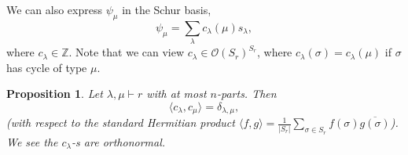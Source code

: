 \documentclass[10pt]{article}
\newtheorem{proposition}{Proposition}[section]
\numberwithin{equation}{theorem}
\newcommand{\Ouv}[0]{\mathcal{O}}
\newcommand{\Z}[0]{\mathbb{Z}}
\begin{document}
We can also express $\psi_\mu$ in the Schur basis, 
\begin{equation}
  \psi_\mu = \sum_{\lambda} c_\lambda(\mu) s_\lambda,
\end{equation}
where $c_\lambda\in\Z$. Note that we can view $c_\lambda\in\Ouv(S_r)^{S_r}$, where $c_\lambda(\sigma)=c_\lambda(\mu)$ if $\sigma$ has cycle of type $\mu$. 
\begin{proposition}
  Let $\lambda,\mu\vdash r$ with at most $n$-parts. Then 
  \begin{equation*}
  \langle c_\lambda,c_\mu\rangle = \delta_{\lambda,\mu},
  \end{equation*}
  (with respect to the standard Hermitian product $\langle f,g\rangle = {\frac 1 {\vert S_r\vert }}\sum_{\sigma\in S_r}f(\sigma)\overline{g(\sigma)}$).
  We see the $c_\lambda$-s are orthonormal.
\end{proposition}
\end{document}
